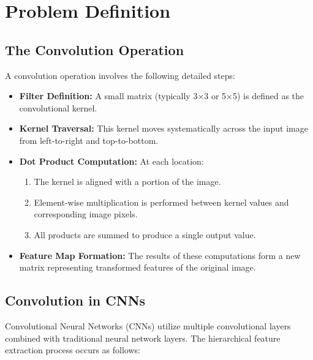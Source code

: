 \documentclass[conference, 10pt]{IEEEtran}
\begin{document}
\section{Problem Definition}

\subsection{The Convolution Operation}
A convolution operation involves the following detailed steps:

\begin{itemize}
    \item \textbf{Filter Definition:} A small matrix (typically 3×3 or 5×5) is defined as the convolutional kernel.
    \item \textbf{Kernel Traversal:} This kernel moves systematically across the input image from left-to-right and top-to-bottom.
    \item \textbf{Dot Product Computation:} At each location:
    \begin{enumerate}
        \item The kernel is aligned with a portion of the image.
        \item Element-wise multiplication is performed between kernel values and corresponding image pixels.
        \item All products are summed to produce a single output value.
    \end{enumerate}
    \item \textbf{Feature Map Formation:} The results of these computations form a new matrix representing transformed features of the original image.
\end{itemize}

\subsection{Convolution in CNNs}
Convolutional Neural Networks (CNNs) utilize multiple convolutional layers combined with traditional neural network layers. The hierarchical feature extraction process occurs as follows:
\end{document}

